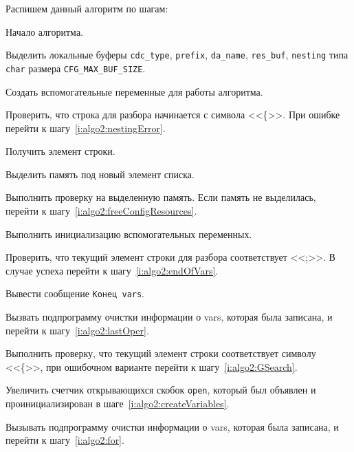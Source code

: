 Распишем данный алгоритм по шагам:
\begin{enumerate_step}
    \item Начало алгоритма.
    \item \label{i:algo2:createBuf} Выделить локальные буферы \lstinline{cdc_type}, \lstinline{prefix}, \lstinline{da_name}, \lstinline{res_buf}, \lstinline{nesting} типа \lstinline{char} размера \lstinline{CFG_MAX_BUF_SIZE}.
    \item \label{i:algo2:createVariables} Создать вспомогательные переменные для работы алгоритма.
    \item Проверить, что строка для разбора начинается с символа <<\{>>. При ошибке
    перейти к шагу~\ref{i:algo2:nestingError}.
    \item \label{i:algo2:for} Получить элемент строки.
    \item Выделить память под новый элемент списка.
    \item Выполнить проверку на выделенную память. Если память не выделилась, перейти к шагу~\ref{i:algo2:freeConfigResources}.
    \item Выполнить инициализацию вспомогательных переменных.
    \item Проверить, что текущий элемент строки для разбора соответствует <<;>>. В случае успеха перейти к шагу~\ref{i:algo2:endOfVars}.
    \item Вывести сообщение \texttt{Конец vars}.
    \item Вызвать подпрограмму очистки информации о vars, которая была записана, и перейти к шагу~\ref{i:algo2:lastOper}.

    \item \label{i:algo2:endOfVars} Выполнить проверку, что текущий элемент строки соответствует символу <<\{>>, при ошибочном варианте перейти к шагу~\ref{i:algo2:GSearch}.
    \item Увеличить счетчик открывающихся скобок \lstinline{open}, который был объявлен и проинициализирован в шаге~\ref{i:algo2:createVariables}.
    \item Вызывать подпрограмму очистки информации о vars, которая была записана, и перейти к шагу~\ref{i:algo2:for}.


\end{enumerate_step}
